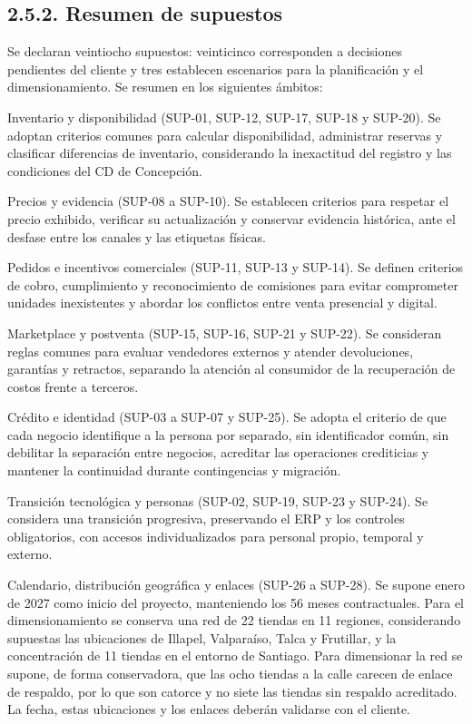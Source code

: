 \documentclass[11pt]{article}
\begin{document}
\subsection{2.5.2. Resumen de supuestos}\label{resumen-de-supuestos}

Se declaran veintiocho supuestos: veinticinco corresponden a decisiones pendientes del cliente y tres establecen escenarios para la planificación y el dimensionamiento. Se resumen en los siguientes ámbitos:

Inventario y disponibilidad (SUP-01, SUP-12, SUP-17, SUP-18 y SUP-20). Se adoptan criterios comunes para calcular disponibilidad, administrar reservas y clasificar diferencias de inventario, considerando la inexactitud del registro y las condiciones del CD de Concepción.

Precios y evidencia (SUP-08 a SUP-10). Se establecen criterios para respetar el precio exhibido, verificar su actualización y conservar evidencia histórica, ante el desfase entre los canales y las etiquetas físicas.

Pedidos e incentivos comerciales (SUP-11, SUP-13 y SUP-14). Se definen criterios de cobro, cumplimiento y reconocimiento de comisiones para evitar comprometer unidades inexistentes y abordar los conflictos entre venta presencial y digital.

Marketplace y postventa (SUP-15, SUP-16, SUP-21 y SUP-22). Se consideran reglas comunes para evaluar vendedores externos y atender devoluciones, garantías y retractos, separando la atención al consumidor de la recuperación de costos frente a terceros.

Crédito e identidad (SUP-03 a SUP-07 y SUP-25). Se adopta el criterio de que cada negocio identifique a la persona por separado, sin identificador común, sin debilitar la separación entre negocios, acreditar las operaciones crediticias y mantener la continuidad durante contingencias y migración.

Transición tecnológica y personas (SUP-02, SUP-19, SUP-23 y SUP-24). Se considera una transición progresiva, preservando el ERP y los controles obligatorios, con accesos individualizados para personal propio, temporal y externo.

Calendario, distribución geográfica y enlaces (SUP-26 a SUP-28). Se supone enero de 2027 como inicio del proyecto, manteniendo los 56 meses contractuales. Para el dimensionamiento se conserva una red de 22 tiendas en 11 regiones, considerando supuestas las ubicaciones de Illapel, Valparaíso, Talca y Frutillar, y la concentración de 11 tiendas en el entorno de Santiago. Para dimensionar la red se supone, de forma conservadora, que las ocho tiendas a la calle carecen de enlace de respaldo, por lo que son catorce y no siete las tiendas sin respaldo acreditado. La fecha, estas ubicaciones y los enlaces deberán validarse con el cliente.
\end{document}
